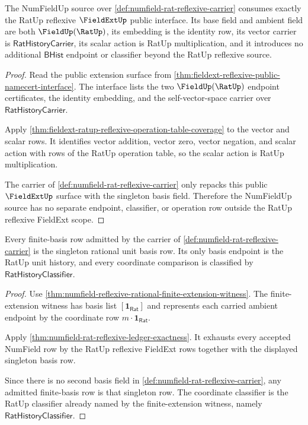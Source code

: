 \begin{theorem}
\label{thm:numfield-reflexive-rational-fieldext-scope}
The NumFieldUp source over \autoref{def:numfield-rat-reflexive-carrier}
consumes exactly the RatUp reflexive $\FieldExtUp$ public interface. Its base
field and ambient field are both $\FieldUp(\RatUp)$, its embedding is the
identity row, its vector carrier is $\mathsf{RatHistoryCarrier}$, its scalar
action is RatUp multiplication, and it introduces no additional
$\mathsf{BHist}$ endpoint or classifier beyond the RatUp reflexive source.
\end{theorem}
\begin{proof}
Read the public extension surface from
\autoref{thm:fieldext-reflexive-public-namecert-interface}. The interface
lists the two $\FieldUp(\RatUp)$ endpoint certificates, the identity embedding,
and the self-vector-space carrier over $\mathsf{RatHistoryCarrier}$.

Apply
\autoref{thm:fieldext-ratup-reflexive-operation-table-coverage} to the vector
and scalar rows. It identifies vector addition, vector zero, vector negation,
and scalar action with rows of the RatUp operation table, so the scalar action
is RatUp multiplication.

The carrier of \autoref{def:numfield-rat-reflexive-carrier} only repacks this
public $\FieldExtUp$ surface with the singleton basis field. Therefore the
NumFieldUp source has no separate endpoint, classifier, or operation row
outside the RatUp reflexive FieldExt scope.
\end{proof}

\begin{theorem}
\label{thm:numfield-reflexive-rational-singleton-basis-exhaustion}
Every finite-basis row admitted by the carrier of
\autoref{def:numfield-rat-reflexive-carrier} is the singleton rational unit
basis row. Its only basis endpoint is the RatUp unit history, and every
coordinate comparison is classified by $\mathsf{RatHistoryClassifier}$.
\end{theorem}
\begin{proof}
Use
\autoref{thm:numfield-reflexive-rational-finite-extension-witness}. The
finite-extension witness has basis list $[\mathbf{1}_{\mathsf{Rat}}]$ and
represents each carried ambient endpoint by the coordinate row
$m\cdot\mathbf{1}_{\mathsf{Rat}}$.

Apply
\autoref{thm:numfield-rat-reflexive-ledger-exactness}. It exhausts every
accepted NumField row by the RatUp reflexive FieldExt rows together with the
displayed singleton basis row.

Since there is no second basis field in
\autoref{def:numfield-rat-reflexive-carrier}, any admitted finite-basis row is
that singleton row. The coordinate classifier is the RatUp classifier already
named by the finite-extension witness, namely
$\mathsf{RatHistoryClassifier}$.
\end{proof}

